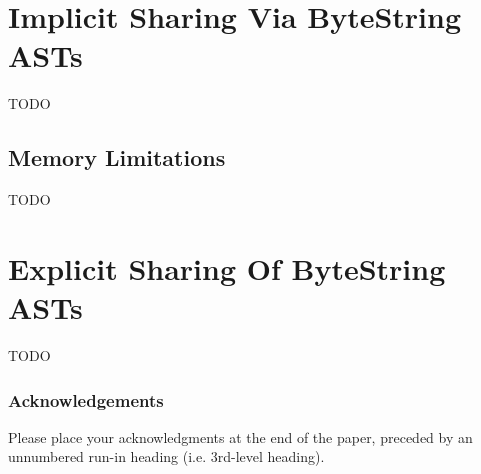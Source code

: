 \documentclass[runningheads]{llncs}
\begin{document}
\section{Implicit Sharing Via ByteString ASTs}
TODO

\subsection{Memory Limitations}
TODO
\section{Explicit Sharing Of ByteString ASTs}
TODO

\subsubsection{Acknowledgements} Please place your acknowledgments at
the end of the paper, preceded by an unnumbered run-in heading (i.e.
3rd-level heading).

%
%


\end{document}
